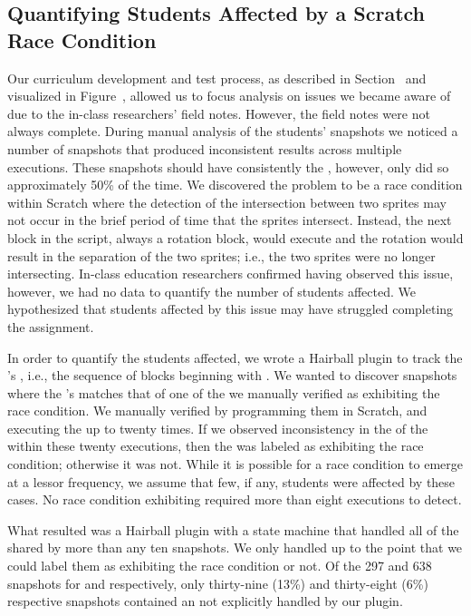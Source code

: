 \subsection{Quantifying Students Affected by a Scratch Race Condition}

Our curriculum development and test process, as described in
Section~ and visualized in Figure~,
allowed us to focus analysis on issues we became aware of due to the in-class
researchers' field notes. However, the field notes were not always
complete. During manual analysis of the students' snapshots we noticed a number
of snapshots that produced inconsistent results across multiple
executions. These snapshots should have consistently \caught{} the \zebra{},
however, only did so approximately 50\% of the time. We discovered the problem
to be a race condition within Scratch where the detection of the intersection
between two sprites may not occur in the brief period of time that the sprites
intersect. Instead, the next block in the script, always a rotation block,
would execute and the rotation would result in the separation of the two
sprites; i.e., the two sprites were no longer intersecting. In-class education
researchers confirmed having observed this issue, however, we had no data to
quantify the number of students affected. We hypothesized that students
affected by this issue may have struggled completing the assignment.

In order to quantify the students affected, we wrote a Hairball plugin to track
the \net{}'s \exe{}, i.e., the sequence of blocks beginning with
\netclicked{}. We wanted to discover snapshots where the \net{}'s \exe{}
matches that of one of the  we manually verified as exhibiting the race
condition. We manually verified  by programming them in Scratch, and
executing the \sprogram{} up to twenty times. If we observed inconsistency in
the  of the \zebra{} within these twenty executions, then the \exe{}
was labeled as exhibiting the race condition; otherwise it was not. While it is
possible for a race condition to emerge at a lessor frequency, we assume that
few, if any, students were affected by these cases. No race condition
exhibiting \exe{} required more than eight executions to detect.

What resulted was a Hairball plugin with a state machine that handled all
 of the \net{} shared by more than any ten snapshots. We only handled
 up to the point that we could label them as exhibiting the race
condition or not. Of the 297 and 638 snapshots for \sone{} and \stwo{}
respectively, only thirty-nine (13\%) and thirty-eight (6\%) respective
snapshots contained an \exe{} not explicitly handled by our plugin.

